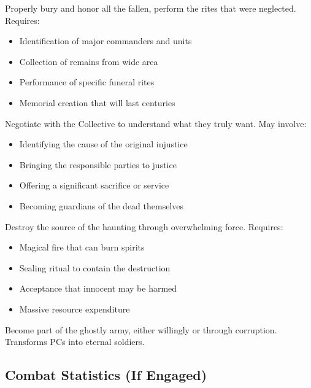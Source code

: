 \documentclass[11pt]{article}
\begin{document}
\begin{description}[leftmargin=*]
\item[The Honored Dead] Properly bury and honor all the fallen, perform the rites that were neglected. Requires:
\begin{itemize}
\item Identification of major commanders and units
\item Collection of remains from wide area
\item Performance of specific funeral rites
\item Memorial creation that will last centuries
\end{itemize}
\item[The Peace Offering] Negotiate with the Collective to understand what they truly want. May involve:
\begin{itemize}
\item Identifying the cause of the original injustice
\item Bringing the responsible parties to justice
\item Offering a significant sacrifice or service
\item Becoming guardians of the dead themselves
\end{itemize}
\item[The Cleansing Fire] Destroy the source of the haunting through overwhelming force. Requires:
\begin{itemize}
\item Magical fire that can burn spirits
\item Sealing ritual to contain the destruction
\item Acceptance that innocent may be harmed
\item Massive resource expenditure
\end{itemize}
\item[Joining the March] Become part of the ghostly army, either willingly or through corruption. Transforms PCs into eternal soldiers.
\end{description}

\subsection*{Combat Statistics (If Engaged)}
\end{document}
